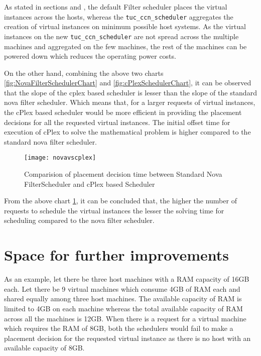 As stated in sections  and , the default Filter scheduler places the virtual instances across the hosts, whereas the \verb|tuc_ccn_scheduler| aggregates the creation of virtual instances on minimum possible host systems.
As the virtual instances on the new \verb|tuc_ccn_scheduler| are not spread across the multiple machines and aggregated on the few machines, the rest of the machines can be powered down which reduces the operating power costs.

On the other hand, combining the above two charts \ref{fig:NovaFilterSchedulerChart} and \ref{fig:cPlexSchedulerChart}, it can be observed that the slope of the cplex based scheduler is lesser than the slope of the standard nova filter scheduler. Which means that, for a larger requests of virtual instances, the cPlex based scheduler would be more efficient in providing the placement decisions for all the requested virtual instances. The initial offset time for execution of cPlex to solve the mathematical problem is higher compared to the standard nova filter scheduler.

\begin{figure}[H]
	\begin{center}
		\texttt{[image: novavscplex]}
		\caption{Comparision of placement decision time between Standard Nova FilterScheduler and cPlex based Scheduler}
		\label{fig:novavscplex}
	\end{center}
	\vspace{-10pt}
\end{figure}

From the above chart \ref{fig:novavscplex}, it can be concluded that, the higher the number of requests to schedule the virtual instances the lesser the solving time for scheduling compared to the nova filter scheduler.

\section{Space for further improvements}\label{sec:spaceforimprovements}

As an example, let there be three host machines with a RAM capacity of 16GB each.
Let there be 9 virtual machines which consume 4GB of RAM each and shared equally among three host machines.
The available capacity of RAM is limited to 4GB on each machine whereas the total available capacity of RAM across all the machines is 12GB.
When there is a request for a virtual machine which requires the RAM of 8GB, both the schedulers would fail to make a placement decision for the requested virtual instance as there is no host with an available capacity of 8GB.

